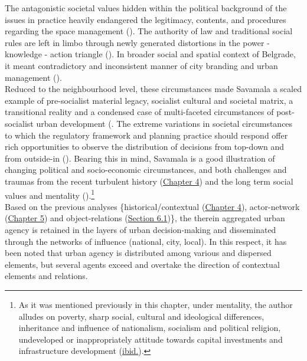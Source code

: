 \documentclass[11pt]{report}
\begin{document}
The antagonistic societal values hidden within the political background of the issues in practice heavily endangered the legitimacy, contents, and procedures regarding the space management (\citealt{vujosevic_planning_2006}).
The authority of law and traditional social rules are left in limbo through newly generated distortions in the power - knowledge - action triangle (\citealt{friedmann_planning_1987}).
In broader social and spatial context of Belgrade, it meant contradictory and inconsistent manner of city branding and urban management
(\citealt{doytchinov_belgrade:_2015}).
\\

Reduced to the neighbourhood level, these circumstances made Savamala a scaled example of pre-socialist material legacy, socialist cultural and societal matrix, a transitional reality and a condensed case of multi-faceted circumstances of post-socialist urban development (\citealt{CvetinovicEtAl2016b}.
The extreme variations in societal circumstances to which the regulatory framework and planning practice should respond offer rich opportunities to observe the distribution of decisions from top-down and from outside-in (\href{Peric}{\cite{peric_evolution_2016}}).
Bearing this in mind, Savamala is a good illustration of changing political and socio-economic circumstances, and both challenges and  traumas from the recent turbulent history (\href{Chapter 4}{Chapter 4}) and the long term social values and mentality (\cite{doytchinov_belgrade_2015}).\footnote{As it was mentioned previously in this chapter, under mentality, the author alludes on poverty, sharp social, cultural and ideological differences, inheritance and influence of nationalism, socialism and political religion, undeveloped or inappropriately attitude towards capital investments and infrastructure development (\href{Samardzic}{ibid.}).}
\\

Based on the previous analyses \{historical/contextual (\href{Chapter 4}{Chapter 4}), actor-network (\href{Chapter 5}{Chapter 5}) and object-relations (\href{Section 6.1}{Section 6.1})\}, the therein aggregated urban agency is retained in the layers of urban decision-making and disseminated through the networks of influence (national, city, local).
In this respect, it has been noted that urban agency is distributed among various and dispersed elements, but several agents exceed and overtake the direction of contextual elements and relations.
\\
\end{document}
